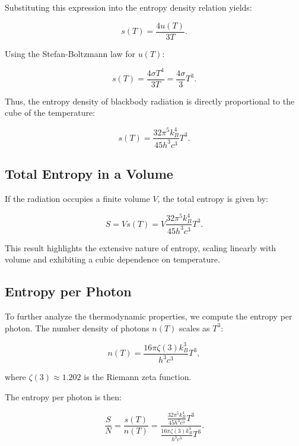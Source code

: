 \documentclass[a4paper,10pt]{article}
\begin{document}
 Substituting this expression into the entropy density relation yields:

 \begin{equation*}
  s(T) = \frac{4 u(T)}{3 T}.
 \end{equation*}

 Using the Stefan-Boltzmann law for $u(T)$:

 \begin{equation*}
  s(T) = \frac{4 \sigma T^4}{3 T} = \frac{4 \sigma}{3} T^3.
 \end{equation*}

 Thus, the entropy density of blackbody radiation is directly proportional to the cube of the temperature:

 \begin{equation*}
  s(T) = \frac{32 \pi^5 k_B^4}{45 h^3 c^3} T^3.
 \end{equation*}

 \subsection*{Total Entropy in a Volume}
 If the radiation occupies a finite volume $V$, the total entropy is given by:

 \begin{equation*}
  S = V s(T) = V \frac{32 \pi^5 k_B^4}{45 h^3 c^3} T^3.
 \end{equation*}

 This result highlights the extensive nature of entropy, scaling linearly with volume and exhibiting a cubic dependence on temperature.

 \subsection*{Entropy per Photon}
 To further analyze the thermodynamic properties, we compute the entropy per photon. The number density of photons $n(T)$ scales as $T^3$:

 \begin{equation*}
  n(T) = \frac{16 \pi \zeta(3) k_B^3}{h^3 c^3} T^3,
 \end{equation*}

 where $\zeta(3) \approx 1.202$ is the Riemann zeta function.

 The entropy per photon is then:

 \begin{equation*}
  \frac{S}{N} = \frac{s(T)}{n(T)} = \frac{\frac{32 \pi^5 k_B^4}{45 h^3 c^3} T^3}{\frac{16 \pi \zeta(3) k_B^3}{h^3 c^3} T^3}.
 \end{equation*}
\end{document}

